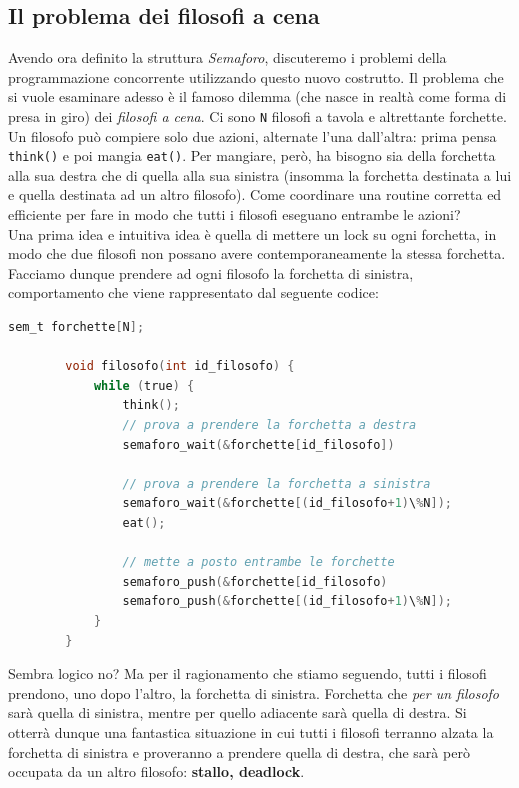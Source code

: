 \documentclass[12pt]{report}
\begin{document}
	\subsection{Il problema dei filosofi a cena}
	Avendo ora definito la struttura \textit{Semaforo}, discuteremo i problemi della programmazione concorrente utilizzando questo nuovo costrutto. Il problema che si vuole esaminare adesso è il famoso dilemma (che nasce in realtà come forma di presa in giro) dei \textit{filosofi a cena}. Ci sono \texttt{N} filosofi a tavola e altrettante forchette. Un filosofo può compiere solo due azioni, alternate l'una dall'altra: prima pensa \texttt{think()} e poi mangia \texttt{eat()}. Per mangiare, però, ha bisogno sia della forchetta alla sua destra che di quella alla sua sinistra (insomma la forchetta destinata a lui e quella destinata ad un altro filosofo). Come coordinare una routine corretta ed efficiente per fare in modo che tutti i filosofi eseguano entrambe le azioni?\\
	Una prima idea e intuitiva idea è quella di mettere un lock su ogni forchetta, in modo che due filosofi non possano avere contemporaneamente la stessa forchetta. Facciamo dunque prendere ad ogni filosofo la forchetta di sinistra, comportamento che viene rappresentato dal seguente codice:
	\begin{lstlisting}[language=C]
		sem_t forchette[N];
		
		void filosofo(int id_filosofo) {
			while (true) {
				think();
				// prova a prendere la forchetta a destra
				semaforo_wait(&forchette[id_filosofo])
				
				// prova a prendere la forchetta a sinistra
				semaforo_wait(&forchette[(id_filosofo+1)\%N]);
				eat();
				
				// mette a posto entrambe le forchette
				semaforo_push(&forchette[id_filosofo)
				semaforo_push(&forchette[(id_filosofo+1)\%N]);
			}
		}
	\end{lstlisting}
	Sembra logico no? Ma per il ragionamento che stiamo seguendo, tutti i filosofi prendono, uno dopo l'altro, la forchetta di sinistra. Forchetta che \textit{per un filosofo} sarà quella di sinistra, mentre per quello adiacente sarà quella di destra. Si otterrà dunque una fantastica situazione in cui tutti i filosofi terranno alzata la forchetta di sinistra e proveranno a prendere quella di destra, che sarà però occupata da un altro filosofo: \textbf{stallo, deadlock}.
	\smallbreak
	
\end{document}
